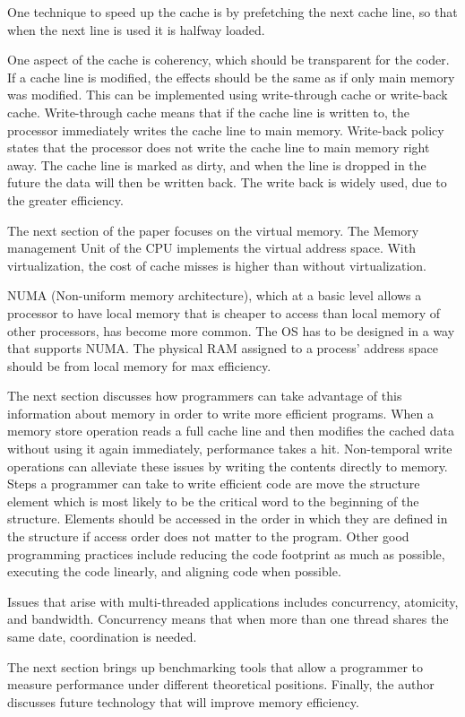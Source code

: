 \documentclass[letterpaper,12pt,titlepage]{article}
\begin{document}
One technique to speed up the cache is by prefetching the next cache line, so that when the next line is used it is halfway loaded.
\newline
\par
One aspect of the cache is coherency, which should be transparent for the coder.
If a cache line is modified, the effects should be the same as if only main memory was modified.
This can be implemented using write-through cache or write-back cache.
Write-through cache means that if the cache line is written to, the processor immediately writes the cache line to main memory.
Write-back policy states that the processor does not write the cache line to main memory right away.
The cache line is marked as dirty, and when the line is dropped in the future the data will then be written back.
The write back is widely used, due to the greater efficiency.
\newline
\par
The next section of the paper focuses on the virtual memory.
The Memory management Unit of the CPU implements the virtual address space.
With virtualization, the cost of cache misses is higher than without virtualization.
\newline
\par
NUMA (Non-uniform memory architecture), which at a basic level allows a processor to have local memory that is cheaper to access than local memory of other processors, has become more common.
The OS has to be designed in a way that supports NUMA.
The physical RAM assigned to a process' address space should be from local memory for max efficiency.
\newline
\par
The next section discusses how programmers can take advantage of this information about memory in order to write more efficient programs.
When a memory store operation reads a full cache line and then modifies the cached data without using it again immediately, performance takes a hit.   
Non-temporal write operations can alleviate these issues by writing the contents directly to memory.
Steps a programmer can take to write efficient code are move the structure element which is most likely to be the critical word to the beginning of the structure.
Elements should be accessed in the order in which they are defined in the structure if access order does not matter to the program.
Other good programming practices include reducing the code footprint as much as possible, executing the code linearly, and aligning code when possible.
\newline
\par
Issues that arise with multi-threaded applications includes concurrency, atomicity, and bandwidth.
Concurrency means that when more than one thread shares the same date, coordination is needed.
\newline
\par
The next section brings up benchmarking tools that allow a programmer to measure performance under different theoretical positions.
Finally, the author discusses future technology that will improve memory efficiency.


 
\end{document}
